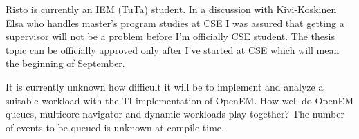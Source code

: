 Risto is currently an IEM (TuTa) student. In a discussion with Kivi-Koskinen Elsa who handles master's program studies at CSE I was assured that getting a supervisor will not be a problem before I'm officially CSE student. The thesis topic can be officially approved only after I've started at CSE which will mean the beginning of September.

It is currently unknown how difficult it will be to implement and analyze a suitable workload with the TI implementation of OpenEM. How well do OpenEM queues, multicore navigator and dynamic workloads play together? The number of events to be queued is unknown at compile time. 